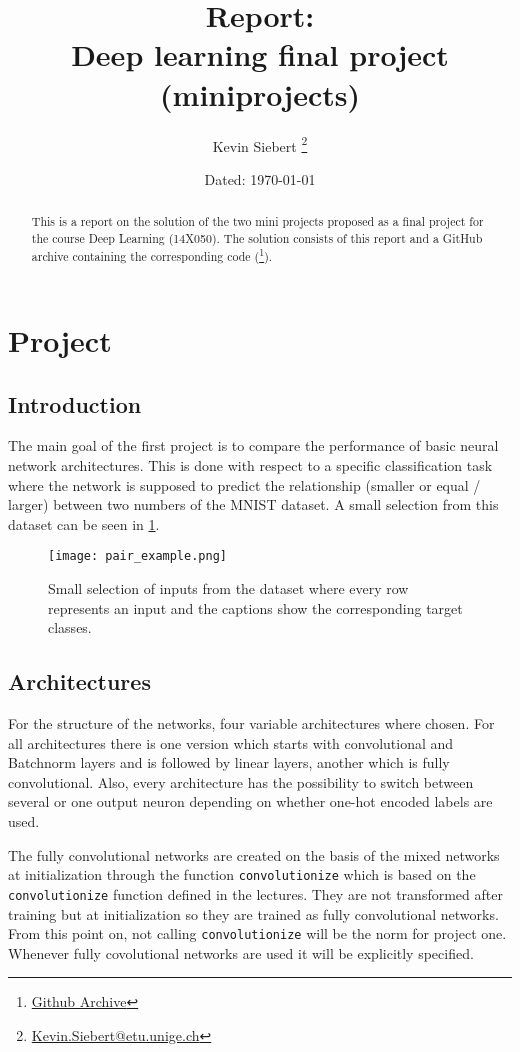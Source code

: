 \documentclass[11pt,english]{article}
\title{\textbf{Report: \\ Deep learning final project (miniprojects)}}
\author{Kevin Siebert%
	\thanks{\textsc{}{\href{mailto:Kevin.Siebert@etu.unige.ch}{Kevin.Siebert@etu.unige.ch}}}}
\affil{Department of Informatics, Faculty of Science, \\ University of Geneva}
\date{Dated: \today}
\begin{document}
	\maketitle
	\vspace{-20pt}
	\begin{abstract}
		This is a report on the solution of the two mini projects proposed as a final project for the course Deep Learning (14X050). The solution consists of this report and a GitHub archive containing the corresponding code (\thanks{\href{https://github.com/I-am-Rudi/DL_FinalProject}{Github Archive}}).
	\end{abstract}
	
	\section{Project} \label{sec:Proj1}
	\vspace{-10pt}
	\subsection{Introduction}
	The main goal of the first project is to compare the performance of basic neural network architectures. This is done with respect to a specific classification task where the network is supposed to predict the relationship (smaller or equal / larger) between two numbers of the MNIST dataset. A small selection from this dataset can be seen in \cref{fig:ex_pair}.
	
	\begin{figure}[H]
		\centering
		\texttt{[image: pair\_example.png]}
		\caption{Small selection of inputs from the dataset where every row represents an input and the captions show the corresponding target classes.}
		\label{fig:ex_pair}
	\end{figure} 


	\subsection{Architectures} \label{ssec:Architectures}
	For the structure of the networks, four variable architectures where chosen. For all architectures there is one version which starts with convolutional and Batchnorm layers and is followed by linear layers, another which is fully convolutional. Also, every architecture has the possibility to switch between several or one output neuron depending on whether one-hot encoded labels are used. 
	
	The fully convolutional networks are created on the basis of the mixed networks at initialization through the function \lstinline|convolutionize| which is based on the \lstinline|convolutionize| function \cite{Fleuret2022} defined in the lectures. They are not transformed after training but at initialization so they are trained as fully convolutional networks. From this point on, not calling  \lstinline|convolutionize| will be the norm for project one. Whenever fully covolutional networks are used it will be explicitly specified.
	
\end{document}
